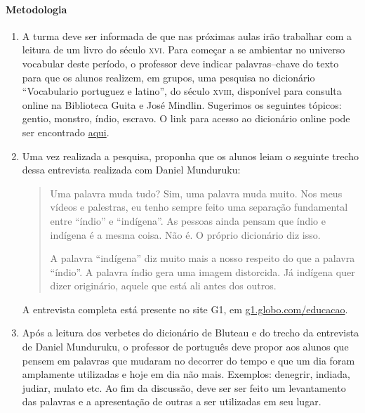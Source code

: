 \documentclass[12pt]{extarticle}
\begin{document}
\paragraph{Metodologia}

\begin{enumerate}

\item 
A turma deve ser informada de que nas próximas aulas irão trabalhar
com a leitura de um livro do século \textsc{xvi}. Para começar a se
ambientar no universo vocabular deste período, o professor deve indicar
palavras--chave do texto para que os alunos realizem, em grupos, uma 
pesquisa no dicionário ``Vocabulario portuguez e latino'', do século 
\textsc{xviii}, disponível para consulta online na Biblioteca Guita e 
José Mindlin. Sugerimos os seguintes tópicos: gentio, monstro, índio, 
escravo.
O link para acesso ao dicionário online pode ser encontrado \href{http://dicionarios.bbm.usp.br/pt-br/dicionario/edicao/1}{aqui}.

\item
Uma vez realizada a pesquisa, proponha que os alunos leiam o seguinte 
trecho dessa entrevista realizada com Daniel Munduruku:

\begin{quote} Uma palavra muda tudo? Sim, uma palavra muda muito. Nos 
meus vídeos e palestras, eu tenho sempre feito uma separação fundamental 
entre ``índio'' e ``indígena''. As pessoas ainda pensam que índio e 
indígena é a mesma coisa. Não é. O próprio dicionário diz isso.

A palavra ``indígena'' diz muito mais a nosso respeito do que a palavra 
``índio''. A palavra índio gera uma imagem distorcida. Já indígena quer 
dizer originário, aquele que está ali antes dos outros.\end{quote}

A entrevista completa está presente no site G1, em \href{https://g1.globo.com/educacao/noticia/2019/04/19/dia-do-indio-e-data-folclorica-e-preconceituosa-diz-escritor-indigena-daniel-munduruku.ghtml}{g1.globo.com/educacao}. 

\item
Após a leitura dos verbetes do dicionário de Bluteau e do trecho da 
entrevista de Daniel Munduruku, o professor de português deve propor 
aos alunos que pensem em palavras que mudaram no decorrer do tempo e que
um dia foram amplamente utilizadas e hoje em dia não mais. Exemplos: 
denegrir, indiada, judiar, mulato etc. Ao fim da discussão, deve ser
ser feito um levantamento das palavras e a apresentação de outras a ser
utilizadas em seu lugar. 

\end{enumerate} 
\end{document}
